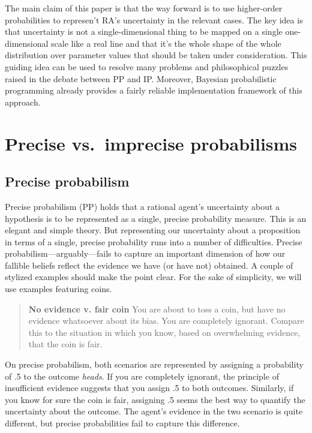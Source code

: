\documentclass[
  letterpaper,
  DIV=11,
  numbers=noendperiod]{scrartcl}
\begin{document}
The main claim of this paper is that the way forward is to use
higher-order probabilities to represen't RA's uncertainty in the
relevant cases. The key idea is that uncertainty is not a
single-dimensional thing to be mapped on a single one-dimensional scale
like a real line and that it's the whole shape of the whole distribution
over parameter values that should be taken under consideration. This
guiding idea can be used to resolve many problems and philosophical
puzzles raised in the debate between PP and IP. Moreover, Bayesian
probabilistic programming already provides a fairly reliable
implementation framework of this approach.


\hypertarget{precise-vs.-imprecise-probabilisms}{%
\section{Precise vs.~imprecise
probabilisms}\label{precise-vs.-imprecise-probabilisms}}

\label{sec:three-probabilism}

\hypertarget{precise-probabilism}{%
\subsection{Precise probabilism}\label{precise-probabilism}}

Precise probabilism (\textsf{PP}) holds that a rational agent's
uncertainty about a hypothesis is to be represented as a single, precise
probability measure. This is an elegant and simple theory. But
representing our uncertainty about a proposition in terms of a single,
precise probability runs into a number of difficulties. Precise
probabilism---arguably---fails to capture an important dimension of how
our fallible beliefs reflect the evidence we have (or have not)
obtained. A couple of stylized examples should make the point clear. For
the sake of simplicity, we will use examples featuring coins.

\begin{quote}
\textbf{No evidence v. fair coin}
You are about to toss a coin, but have no evidence 
whatsoever about its bias. You are completely ignorant. 
Compare this to the situation in which you know, 
based on overwhelming evidence, that the coin is fair. 
\end{quote}

\noindent On precise probabilism, both scenarios are represented by
assigning a probability of .5 to the outcome \emph{heads}. If you are
completely ignorant, the principle of insufficient evidence suggests
that you assign .5 to both outcomes. Similarly, if you know for sure the
coin is fair, assigning .5 seems the best way to quantify the
uncertainty about the outcome. The agent's evidence in the two scenario
is quite different, but precise probabilities fail to capture this
difference.
\end{document}

